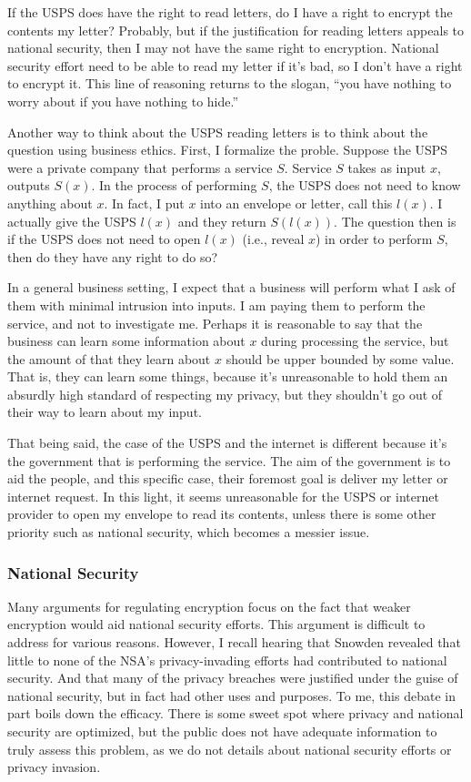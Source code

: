 \documentclass[11pt]{article}
\begin{document}
If the USPS does have the right to read letters, do I have a right to encrypt the contents my letter?
Probably, but if the justification for reading letters appeals to national security, then I may not have the same right to encryption.
National security effort need to be able to read my letter if it's bad, so I don't have a right to encrypt it.
This line of reasoning returns to the slogan, ``you have nothing to worry about if you have nothing to hide.''

Another way to think about the USPS reading letters is to think about the question using business ethics.
First, I formalize the proble.
Suppose the USPS were a private company that performs a service $S$.
Service $S$ takes as input $x$, outputs $S(x)$.
In the process of performing $S$, the USPS does not need to know anything about $x$.
In fact, I put $x$ into an envelope or letter, call this $l(x)$.
I actually give the USPS $l(x)$ and they return $S(l(x))$.
The question then is if the USPS does not need to open $l(x)$ (i.e., reveal $x$) in order to perform $S$, then do they have any right to do so?

In a general business setting, I expect that a business will perform what I ask of them with minimal intrusion into inputs.
I am paying them to perform the service, and not to investigate me.
Perhaps it is reasonable to say that the business can learn some information about $x$ during processing the service, but the amount of that they learn about $x$ should be upper bounded by some value.
That is, they can learn some things, because it's unreasonable to hold them an absurdly high standard of respecting my privacy, but they shouldn't go out of their way to learn about my input.

That being said, the case of the USPS and the internet is different because it's the government that is performing the service.
The aim of the government is to aid the people, and this specific case, their foremost goal is deliver my letter or internet request.
In this light, it seems unreasonable for the USPS or internet provider to open my envelope to read its contents, unless there is some other priority such as national security, which becomes a messier issue.

\subsubsection{National Security}
Many arguments for regulating encryption focus on the fact that weaker encryption would aid national security efforts.
This argument is difficult to address for various reasons.
However, I recall hearing that Snowden revealed that little to none of the NSA's privacy-invading efforts had contributed to national security.
And that many of the privacy breaches were justified under the guise of national security, but in fact had other uses and purposes.
To me, this debate in part boils down the efficacy.
There is some sweet spot where privacy and national security are optimized, but the public does not have adequate information to truly assess this problem, as we do not details about national security efforts or privacy invasion.


%
%
\end{document}
